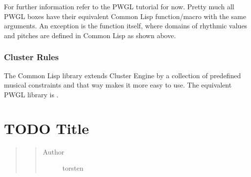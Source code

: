 \documentclass[letterpaper,10pt,english]{sphinxmanual}
\begin{document}
\begin{sphinxVerbatim}[commandchars=\\\{\}]
            
                      
\end{sphinxVerbatim}

\noindent{}

For further information refer to the PWGL tutorial for now. Pretty much all PWGL boxes have their equivalent Common Lisp function/macro with the same arguments. An exception is the function  itself, where domains of rhythmic values and pitches are defined in Common Lisp as shown above.


\subsection{Cluster Rules}
\label{\detokenize{readme:cluster-rules}}
The Common Lisp library  extends Cluster Engine by a collection of predefined musical constraints and that way makes it more easy to use. The equivalent PWGL library is .


\chapter{TODO Title}
\label{\detokenize{API::doc}}\label{\detokenize{API:todo-title}}\begin{quote}
\begin{quote}\begin{description}
\item[{Author}] \leavevmode
torsten

\end{description}\end{quote}
\end{quote}
\end{document}
